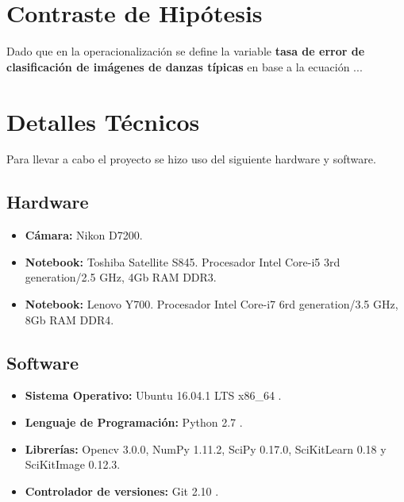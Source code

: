 \section{Contraste de Hipótesis}

Dado que en la operacionalización se define la variable \textbf{tasa de error de clasificación de imágenes de danzas típicas} en base a la ecuación ...

\section{Detalles Técnicos}
\label{detalles-tecnicos}

Para llevar a cabo el proyecto se hizo uso del siguiente hardware y software.

\subsection{Hardware}
\begin{itemize}
\item \textbf{Cámara:} Nikon D7200.
\item \textbf{Notebook:} Toshiba Satellite S845. Procesador Intel Core-i5 3rd generation/2.5 GHz, 4Gb RAM DDR3.
\item \textbf{Notebook:} Lenovo Y700. Procesador Intel Core-i7 6rd generation/3.5 GHz, 8Gb RAM DDR4.
\end{itemize}

\subsection{Software}
\begin{itemize}
\item \textbf{Sistema Operativo:} Ubuntu 16.04.1 LTS x86\_64 .
\item \textbf{Lenguaje de Programación:} Python 2.7 .
\item \textbf{Librerías:} Opencv 3.0.0, NumPy 1.11.2, SciPy 0.17.0, SciKitLearn 0.18 y SciKitImage 0.12.3.
\item \textbf{Controlador de versiones:} Git 2.10 .
\end{itemize}


